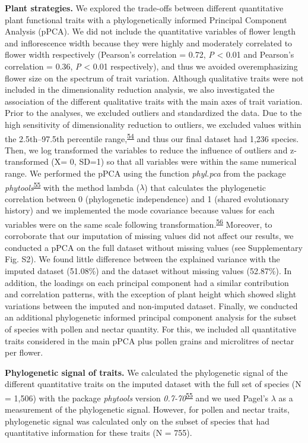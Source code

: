 \documentclass[
  12pt,
  a4paper,
]{article}
\begin{document}
\textbf{Plant strategies.} We explored the trade-offs between different quantitative plant functional traits with a phylogenetically informed Principal Component Analysis (pPCA). We did not include the quantitative variables of flower length and inflorescence width because they were highly and moderately correlated to flower width respectively (Pearson's correlation = 0.72, \emph{P} \textless{} 0.01 and Pearson's correlation = 0.36, \emph{P} \textless{} 0.01 respectively), and thus we avoided overemphasizing flower size on the spectrum of trait variation. Although qualitative traits were not included in the dimensionality reduction analysis, we also investigated the association of the different qualitative traits with the main axes of trait variation. Prior to the analyses, we excluded outliers and standardized the data. Due to the high sensitivity of dimensionality reduction to outliers, we excluded values within the 2.5th--97.5th percentile range,\textsuperscript{\protect\hyperlink{ref-legendre2012}{54}} and thus our final dataset had 1,236 species. Then, we log transformed the variables to reduce the influence of outliers and z-transformed (X= 0, SD=1) so that all variables were within the same numerical range. We performed the pPCA using the function \emph{phyl.pca} from the package \emph{phytools}\textsuperscript{\protect\hyperlink{ref-revell2012}{55}} with the method lambda (\(\lambda\)) that calculates the phylogenetic correlation between 0 (phylogenetic independence) and 1 (shared evolutionary history) and we implemented the mode covariance because values for each variables were on the same scale following transformation.\textsuperscript{\protect\hyperlink{ref-abdi2010}{56}} Moreover, to corroborate that our imputation of missing values did not affect our results, we conducted a pPCA on the full dataset without missing values (see Supplementary Fig. S2). We found little difference between the explained variance with the imputed dataset (51.08\%) and the dataset without missing values (52.87\%). In addition, the loadings on each principal component had a similar contribution and correlation patterns, with the exception of plant height which showed slight variations between the imputed and non-imputed dataset. Finally, we conducted an additional phylogenetic informed principal component analysis for the subset of species with pollen and nectar quantity. For this, we included all quantitative traits considered in the main pPCA plus pollen grains and microlitres of nectar per flower.

\textbf{Phylogenetic signal of traits.} We calculated the phylogenetic signal of the different quantitative traits on the imputed dataset with the full set of species (N = 1,506) with the package \emph{phytools} version \emph{0.7-70}\textsuperscript{\protect\hyperlink{ref-revell2012}{55}} and we used Pagel's \(\lambda\) as a measurement of the phylogenetic signal. However, for pollen and nectar traits, phylogenetic signal was calculated only on the subset of species that had quantitative information for these traits (N = 755).
\end{document}
